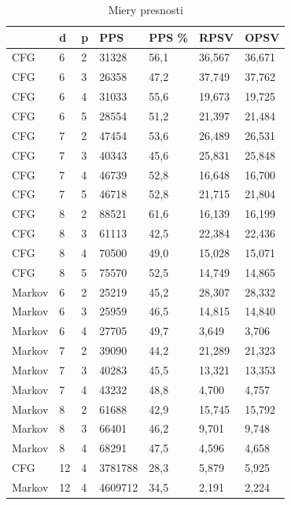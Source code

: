 \begin{table}[]
\centering
\caption{Miery presnosti}
\label{mieryPresnosti}
\begin{tabular}{lll|llll}
       & d  & p & PPS & PPS \% & RPSV  & OPSV\\ \hline
CFG    & 6  & 2 & 31328    & 56,1       & 36,567 & 36,671    \\
CFG    & 6  & 3 & 26358    & 47,2       & 37,749 & 37,762    \\
CFG    & 6  & 4 & 31033    & 55,6       & 19,673 & 19,725    \\
CFG    & 6  & 5 & 28554    & 51,2       & 21,397 & 21,484    \\
CFG    & 7  & 2 & 47454    & 53,6       & 26,489 & 26,531    \\
CFG    & 7  & 3 & 40343    & 45,6       & 25,831 & 25,848    \\
CFG    & 7  & 4 & 46739    & 52,8       & 16,648 & 16,700    \\
CFG    & 7  & 5 & 46718    & 52,8       & 21,715 & 21,804    \\
CFG    & 8  & 2 & 88521    & 61,6       & 16,139 & 16,199    \\
CFG    & 8  & 3 & 61113    & 42,5       & 22,384 & 22,436    \\
CFG    & 8  & 4 & 70500    & 49,0       & 15,028 & 15,071    \\
CFG    & 8  & 5 & 75570    & 52,5       & 14,749 & 14,865    \\
Markov & 6  & 2 & 25219    & 45,2       & 28,307 & 28,332    \\
Markov & 6  & 3 & 25959    & 46,5       & 14,815 & 14,840    \\
Markov & 6  & 4 & 27705    & 49,7       & 3,649 & 3,706    \\
Markov & 7  & 2 & 39090    & 44,2       & 21,289 & 21,323    \\
Markov & 7  & 3 & 40283    & 45,5       & 13,321 & 13,353    \\
Markov & 7  & 4 & 43232    & 48,8       & 4,700 & 4,757    \\
Markov & 8  & 2 & 61688    & 42,9       & 15,745 & 15,792    \\
Markov & 8  & 3 & 66401    & 46,2       & 9,701 & 9,748    \\
Markov & 8  & 4 & 68291    & 47,5       & 4,596 & 4,658    \\ \hline \hline
CFG    & 12 & 4 & 3781788    & 28,3       & 5,879 & 5,925    \\
Markov & 12 & 4 & 4609712    & 34,5       & 2,191 & 2,224   
\end{tabular}
\end{table}

